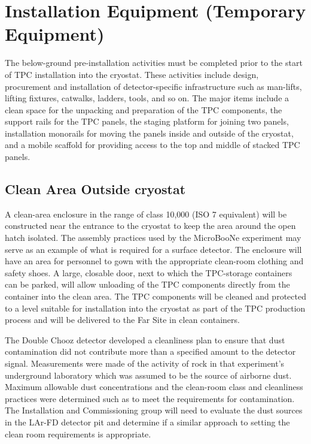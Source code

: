 \section{Installation Equipment (Temporary Equipment)}
\label{fd:install:tempeqp}

The below-ground pre-installation activities must be completed prior to the start of TPC installation into the cryostat. These activities include design, procurement and installation of detector-specific 
infrastructure such as man-lifts, lifting fixtures, catwalks, ladders, tools, and so on. The major items include a clean space for the unpacking and preparation of the TPC components, the support rails for the 
TPC panels, the staging platform for joining two panels, installation monorails for moving the panels inside and outside of the cryostat, and a mobile scaffold for providing access to 
the top and middle of stacked TPC panels. 

\subsection{Clean Area Outside cryostat}
\label{fd:install:tempeqp:cleanarea}

A clean-area enclosure in the range of class 10,000 (ISO 7 equivalent) will be constructed near the entrance to the cryostat to keep the area around the open hatch isolated. The assembly practices used by 
the MicroBooNe experiment may serve as an example of what is required for a surface detector. The enclosure will have an area for personnel to gown with the appropriate clean-room clothing and safety 
shoes. A large, closable door, next to which the TPC-storage containers can be parked, will allow unloading of the TPC components directly from the container into the clean area. The TPC components 
will be cleaned and protected to a level suitable for installation into the cryostat as part of the TPC production process and will be delivered to the Far Site in clean containers. 

The Double Chooz detector developed a cleanliness plan to ensure that dust contamination did not contribute more than a specified amount to the detector signal. Measurements were made of the activity 
of rock in that experiment’s underground laboratory which was assumed to be the source of airborne dust. Maximum allowable dust concentrations and the clean-room class and cleanliness practices were 
determined such as to meet the requirements for contamination. The Installation and Commissioning group will need to evaluate the dust sources in the LAr-FD detector pit and determine if a similar 
approach to setting the clean room requirements is appropriate. 

